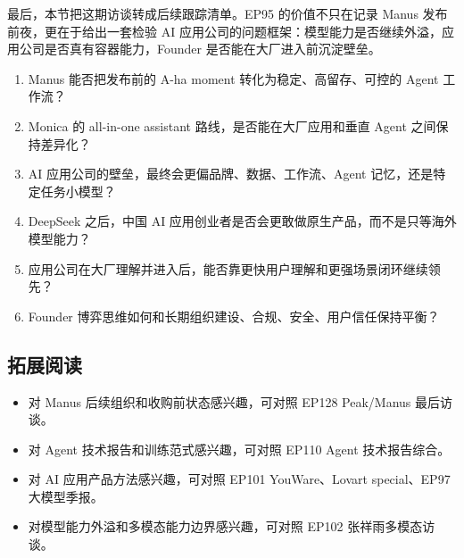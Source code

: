最后，本节把这期访谈转成后续跟踪清单。EP95 的价值不只在记录 Manus 发布前夜，更在于给出一套检验 AI 应用公司的问题框架：模型能力是否继续外溢，应用公司是否真有容器能力，Founder 是否能在大厂进入前沉淀壁垒。

\begin{enumerate}
\item Manus 能否把发布前的 A-ha moment 转化为稳定、高留存、可控的 Agent 工作流？
\item Monica 的 all-in-one assistant 路线，是否能在大厂应用和垂直 Agent 之间保持差异化？
\item AI 应用公司的壁垒，最终会更偏品牌、数据、工作流、Agent 记忆，还是特定任务小模型？
\item DeepSeek 之后，中国 AI 应用创业者是否会更敢做原生产品，而不是只等海外模型能力？
\item 应用公司在大厂理解并进入后，能否靠更快用户理解和更强场景闭环继续领先？
\item Founder 博弈思维如何和长期组织建设、合规、安全、用户信任保持平衡？
\end{enumerate}

\subsection{拓展阅读}

\begin{itemize}
\item 对 Manus 后续组织和收购前状态感兴趣，可对照 EP128 Peak/Manus 最后访谈。
\item 对 Agent 技术报告和训练范式感兴趣，可对照 EP110 Agent 技术报告综合。
\item 对 AI 应用产品方法感兴趣，可对照 EP101 YouWare、Lovart special、EP97 大模型季报。
\item 对模型能力外溢和多模态能力边界感兴趣，可对照 EP102 张祥雨多模态访谈。
\end{itemize}


